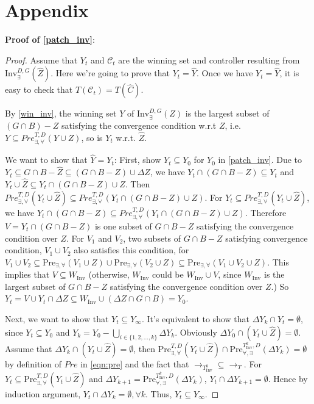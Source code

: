 \iffalse
\section{Appendix}
\textbf{Proof of \eqref{patch_inv}}:

\begin{proof}
	Assume that $ Y_t $ and $ \mathcal{C}_t $ are the winning set and controller resulting from $ \text{Inv}_{\exists}^{D,G} (\widehat{Z}) $. Here we're going to prove that $ Y_t=\widehat{Y}$. Once we have $ Y_t=\widehat{Y}$, it is easy to check that $ T(\mathcal{C}_t) = T(\widehat{C}) $.
	
	By \eqref{win_inv}, the winning set $ Y $ of $ \text{Inv}_{\exists}^{D,G} (Z) $ is the largest subset of $ (G\cap B) - Z  $ satisfying the convergence condition w.r.t $ Z $, i.e. $ Y \subseteq Pre^{T,D}_{\exists, \forall}(Y\cup Z) $, so is $ Y_t $ w.r.t. $ \widehat{Z} $.
	
	We want to show that $ \widehat{Y} = Y_t$: First, show $ Y_t \subseteq Y_0 $ for $ Y_0 $ in \eqref{patch_inv}. Due to $ Y_t \subseteq G\cap B-\widehat{Z} \subseteq (G\cap B -Z)\cup \Delta Z $, we have $ Y_t\cap (G\cap B-Z)\subseteq Y_t $ and $ Y_t\cup \widehat{Z} \subseteq Y_t\cap (G\cap B-Z)\cup Z$. Then $ Pre^{T,D}_{\exists,\forall}(Y_t\cup \widehat{Z}) \subseteq Pre^{T,D}_{\exists,\forall}(Y_t\cap (G\cap B-Z)\cup Z)$. For $ Y_t \subseteq Pre^{T,D}_{\exists,\forall}(Y_t\cup \widehat{Z})$, we have $ Y_t\cap (G\cap B-Z)\subseteq Pre^{T,D}_{\exists,\forall}(Y_t\cap (G\cap B-Z)\cup Z) $. Therefore $ V= Y_t \cap (G\cap B -Z) $ is one subset of $ G\cap B -Z $ satisfying the convergence condition over $ Z $. For $ V_1 $ and $ V_2 $, two subsets of $ G\cap B-Z $ satisfying convergence condition, $ V_1\cup V_2 $ also satisfies this condition, for $ V_1\cup V_2\subseteq \text{Pre}_{\exists,\forall}(V_1\cup Z)\cup \text{Pre}_{\exists,\forall}(V_2\cup Z)\subseteq \text{Pre}_{\exists,\forall}(V_1\cup V_2\cup Z) $. This implies that $ V \subseteq W_{\text{Inv}} $ (otherwise, $ W_{\text{Inv}} $ could be $ W_{\text{Inv}}\cup V $, since $ W_{\text{Inv}} $ is the largest subset of $ G\cap B-Z $ satisfying the convergence condition over $ Z $.) So $ Y_t = V\cup Y_t\cap \Delta Z \subseteq W_{\text{Inv}}\cup (\Delta Z \cap G\cap B) = Y_0$. 
	
	Next, we want to show that $ Y_t \subseteq Y_{\infty} $. It's equivalent to show that $ \Delta Y_k\cap Y_t = \emptyset $, since $ Y_t\subseteq Y_0 $ and $ Y_k = Y_0 - \bigcup_{i\in \{1,2,...,k\}} \Delta Y_k$. Obviously $ \Delta Y_0\cap (Y_t\cup \widehat{Z}) = \emptyset $. Assume that $ \Delta Y_k \cap (Y_t\cup \widehat{Z}) = \emptyset $, then $ \text{Pre}_{\exists,\forall}^{T,D} (Y_t\cup \widehat{Z}) \cap \text{Pre}_{\forall, \exists}^{T_{\text{Inv}}^k,D}(\Delta Y_k) = \emptyset$ by definition of $ Pre $ in \eqref{eqn:pre} and the fact that $ \rightarrow_{T_{\text{Inv}}^k}\subseteq \rightarrow_{T} $. For $ Y_t \subseteq \text{Pre}_{\exists,\forall}^{T,D} (Y_t\cup \widehat{Z}) $ and $ \Delta Y_{k+1} = \text{Pre}_{\forall, \exists}^{T_{\text{Inv}}^k,D}(\Delta Y_k) $, $ Y_t\cap \Delta Y_{k+1} = \emptyset $. Hence by induction argument, $ Y_t \cap \Delta Y_k = \emptyset, \forall k $. Thus, $ Y_t\subseteq Y_{\infty} $. 
	

\end{proof}
